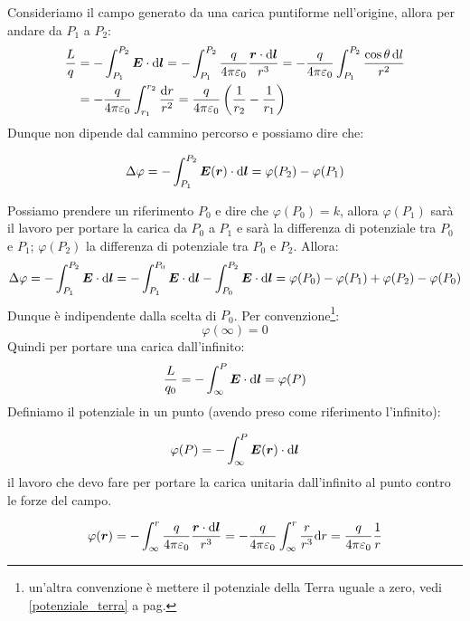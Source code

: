 Consideriamo il campo generato da una carica puntiforme nell'origine, allora per andare da $P_1$ a $P_2$:
\begin{align*}
  \frac{L}{q} & =-\int_{P_1}^{P_2}\boldsymbol{E}\cdot\mathrm{d}\boldsymbol{l}=-\int_{P_1}^{P_2}\frac{q}{4\pi\varepsilon_0}\frac{\boldsymbol{r}\cdot\mathrm{d}\boldsymbol{l}}{r^3}=-\frac{q}{4\pi\varepsilon_0}\int_{P_1}^{P_2}\frac{\cos\theta\,\mathrm{d} l}{r^2} \\
              & =-\frac{q}{4\pi\varepsilon_0}\int_{r_1}^{r_2}\frac{\mathrm{d} r}{r^2}=\frac{q}{4\pi\varepsilon_0}\left(\frac{1}{r_2}-\frac{1}{r_1}\right)
\end{align*}
Dunque non dipende dal cammino percorso e possiamo dire che:
\begin{Teo}
  \begin{equation}
    \Delta \varphi=-\int_{P_1}^{P_2}\boldsymbol{E}(\boldsymbol{r})\cdot\mathrm{d}\boldsymbol{l}=\varphi(P_2)-\varphi(P_1)
  \end{equation}
\end{Teo}
Possiamo prendere un riferimento $P_0$ e dire che $\varphi(P_0)=k$, allora $\varphi(P_1)$ sarà il lavoro per portare la carica da $P_0$ a $P_1$ e sarà la differenza di potenziale tra $P_0$ e $P_1$; $\varphi(P_2)$ la differenza di potenziale tra $P_0$ e $P_2$. Allora:
\[\Delta \varphi=-\int_{P_1}^{P_2}\boldsymbol{E}\cdot\mathrm{d}\boldsymbol{l}=-\int_{P_1}^{P_0}\boldsymbol{E}\cdot\mathrm{d}\boldsymbol{l}-\int_{P_0}^{P_2}\boldsymbol{E}\cdot\mathrm{d}\boldsymbol{l}=\varphi(P_0)-\varphi(P_1)+\varphi(P_2)-\varphi(P_0)\]
Dunque è indipendente dalla scelta di $P_0$. Per convenzione\footnote{un'altra convenzione è mettere il potenziale della Terra uguale a zero, vedi \eqref{potenziale_terra} a pag.\@\pageref{potenziale_terra}}:
\[\varphi(\infty)=0\]
Quindi per portare una carica dall'infinito:
\[\frac{L}{q_0}=-\int_{\infty}^{P}\boldsymbol{E}\cdot\mathrm{d} \boldsymbol{l}=\varphi(P)\]
Definiamo il potenziale in un punto (avendo preso come riferimento l'infinito):
\begin{Def}[potenziale]
  \begin{equation}
    \varphi(P)=-\int_{\infty}^P\boldsymbol{E}(\boldsymbol{r})\cdot\mathrm{d}\boldsymbol{l}
  \end{equation}
  il lavoro che devo fare per portare la carica unitaria dall'infinito al punto contro le forze del campo.
\end{Def}
\begin{Es}
  \[
    \varphi(\boldsymbol{r})=-\int_{\infty}^r\frac{q}{4\pi\varepsilon_0}\frac{\boldsymbol{r}\cdot\mathrm{d}\boldsymbol{l}}{r^3}=-\frac{q}{4\pi\varepsilon_0}\int_\infty^r\frac{r}{r^3}\mathrm{d} r=\frac{q}{4\pi\varepsilon_0}\frac{1}{r}
  \]
\end{Es}
